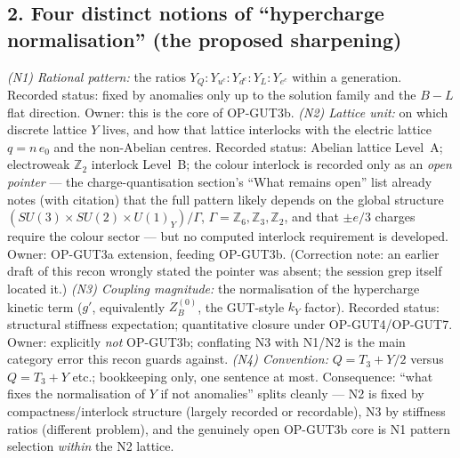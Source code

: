 \subsection*{2. Four distinct notions of ``hypercharge
normalisation'' (the proposed sharpening)}
\emph{(N1) Rational pattern:} the ratios
$Y_Q:Y_{u^c}:Y_{d^c}:Y_L:Y_{e^c}$ within a generation.
Recorded status: fixed by anomalies only up to the solution family
and the $B{-}L$ flat direction.
Owner: this is the core of OP-GUT3b.
\emph{(N2) Lattice unit:} on which discrete lattice $Y$ lives,
and how that lattice interlocks with the electric lattice
$q=n\,e_0$ and the non-Abelian centres.
Recorded status: Abelian lattice Level~A; electroweak
$\mathbb Z_2$ interlock Level~B; the colour interlock is
recorded only as an \emph{open pointer} --- the
charge-quantisation section's ``What remains open'' list already
notes (with citation) that the full pattern likely depends on the
global structure $(SU(3)\times SU(2)\times U(1)_Y)/\Gamma$,
$\Gamma=\mathbb Z_6,\mathbb Z_3,\mathbb Z_2$, and that
$\pm e/3$ charges require the colour sector --- but no computed
interlock requirement is developed.
Owner: OP-GUT3a extension, feeding OP-GUT3b.
(Correction note: an earlier draft of this recon wrongly stated
the pointer was absent; the session grep itself located it.)
\emph{(N3) Coupling magnitude:} the normalisation of the
hypercharge kinetic term ($g'$, equivalently $Z_B^{(0)}$, the
GUT-style $k_Y$ factor).
Recorded status: structural stiffness expectation; quantitative
closure under OP-GUT4/OP-GUT7.
Owner: explicitly \emph{not} OP-GUT3b; conflating N3 with N1/N2 is
the main category error this recon guards against.
\emph{(N4) Convention:} $Q=T_3+Y/2$ versus $Q=T_3+Y$ etc.;
bookkeeping only, one sentence at most.
Consequence: ``what fixes the normalisation of $Y$ if not
anomalies'' splits cleanly --- N2 is fixed by compactness/interlock
structure (largely recorded or recordable), N3 by stiffness ratios
(different problem), and the genuinely open OP-GUT3b core is N1
pattern selection \emph{within} the N2 lattice.

